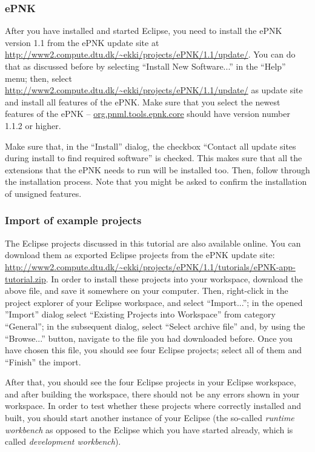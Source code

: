 \subsubsection{ePNK}
\label{sec:tutorial:technical:install:epnk}

After you have installed and started Eclipse, you need to install the ePNK
version 1.1 from the ePNK update site at
\url{http://www2.compute.dtu.dk/~ekki/projects/ePNK/1.1/update/}. You can
do that as discussed before by selecting ``Install New Software...'' in the
``Help'' menu; then, select
\url{http://www2.compute.dtu.dk/~ekki/projects/ePNK/1.1/update/} %
as update site and install all features of the ePNK. Make sure that
you select the newest features of the ePNK -- \url{org.pnml.tools.epnk.core} should have version number 1.1.2 or higher.

Make sure that, in the ``Install'' dialog, the checkbox ``Contact all update
sites during install to find required software'' is checked. This makes sure that
all the extensions that the ePNK needs to run will be installed too. Then,
follow through the installation process. Note that you might be asked to confirm the
installation of unsigned features.

\subsubsection{Import of example projects}
\label{sec:tutorial:technical:install:example}

The Eclipse projects discussed in this tutorial are also available online. You
can download them as exported Eclipse projects from the ePNK update site:
\url{http://www2.compute.dtu.dk/~ekki/projects/ePNK/1.1/tutorials/ePNK-app-tutorial.zip}.
In order to install these projects into your workspace, download the above file,
and save it somewhere on your computer. Then, right-click in the project
explorer of your Eclipse workspace, and select ``Import...''; in the opened
''Import'' dialog select ``Existing Projects into Workspace'' from category
``General''; in the subsequent dialog, select ``Select archive file'' and,
by using the ``Browse...'' button, navigate to the file you had downloaded
before. Once you have chosen this file, you should see four Eclipse projects;
select all of them and ``Finish'' the import.

After that, you should see the four Eclipse projects in your Eclipse workspace,
and after building the workspace, there should not be any errors shown in your
workspace. In order to test whether these projects where correctly installed
and built, you should start another instance of your Eclipse (the so-called
\emph{runtime workbench} as opposed to the Eclipse which you have started
already, which is called \emph{development workbench}).

